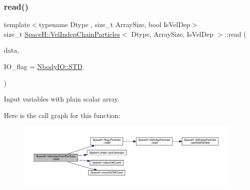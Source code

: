 \subsubsection{\texorpdfstring{read()}{read()}\hspace{0.1cm}{\footnotesize\ttfamily [1/2]}}
{\footnotesize\ttfamily template$<$typename Dtype , size\+\_\+t Array\+Size, bool Is\+Vel\+Dep$>$ \\
size\+\_\+t \mbox{\hyperlink{class_space_h_1_1_vel_indep_chain_particles}{Space\+H\+::\+Vel\+Indep\+Chain\+Particles}}$<$ Dtype, Array\+Size, Is\+Vel\+Dep $>$\+::read (\begin{DoxyParamCaption}\item[{const \mbox{\hyperlink{class_space_h_1_1_vel_indep_particles_abca40159a816385790d5a6fd19c1dc6d}{Scalar\+Buffer}} \&}]{data,  }\item[{const \mbox{\hyperlink{namespace_space_h_a296a8bae763a754564bfdce216e31b59}{Nbody\+IO}}}]{I\+O\+\_\+flag = {\ttfamily \mbox{\hyperlink{namespace_space_h_a296a8bae763a754564bfdce216e31b59ac6ce23be5d350ce18a665427d2d950f7}{Nbody\+I\+O\+::\+S\+TD}}} }\end{DoxyParamCaption})\hspace{0.3cm}{\ttfamily [inline]}}



Input variables with plain scalar array. 

Here is the call graph for this function\+:
\nopagebreak
\begin{figure}[H]
\begin{center}
\leavevmode
\includegraphics[width=350pt]{class_space_h_1_1_vel_indep_chain_particles_a60778581313c992696314625eb2b30cf_cgraph}
\end{center}
\end{figure}
\mbox{\label{class_space_h_1_1_vel_indep_chain_particles_a60778581313c992696314625eb2b30cf}} 
